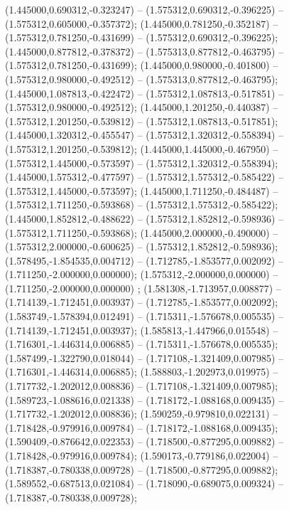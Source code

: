  (1.445000,0.690312,-0.323247) -- (1.575312,0.690312,-0.396225) -- (1.575312,0.605000,-0.357372);
 (1.445000,0.781250,-0.352187) -- (1.575312,0.781250,-0.431699) -- (1.575312,0.690312,-0.396225);
 (1.445000,0.877812,-0.378372) -- (1.575313,0.877812,-0.463795) -- (1.575312,0.781250,-0.431699);
 (1.445000,0.980000,-0.401800) -- (1.575312,0.980000,-0.492512) -- (1.575313,0.877812,-0.463795);
 (1.445000,1.087813,-0.422472) -- (1.575312,1.087813,-0.517851) -- (1.575312,0.980000,-0.492512);
 (1.445000,1.201250,-0.440387) -- (1.575312,1.201250,-0.539812) -- (1.575312,1.087813,-0.517851);
 (1.445000,1.320312,-0.455547) -- (1.575312,1.320312,-0.558394) -- (1.575312,1.201250,-0.539812);
 (1.445000,1.445000,-0.467950) -- (1.575312,1.445000,-0.573597) -- (1.575312,1.320312,-0.558394);
 (1.445000,1.575312,-0.477597) -- (1.575312,1.575312,-0.585422) -- (1.575312,1.445000,-0.573597);
 (1.445000,1.711250,-0.484487) -- (1.575312,1.711250,-0.593868) -- (1.575312,1.575312,-0.585422);
 (1.445000,1.852812,-0.488622) -- (1.575312,1.852812,-0.598936) -- (1.575312,1.711250,-0.593868);
 (1.445000,2.000000,-0.490000) -- (1.575312,2.000000,-0.600625) -- (1.575312,1.852812,-0.598936);
 (1.578495,-1.854535,0.004712) -- (1.712785,-1.853577,0.002092) -- (1.711250,-2.000000,0.000000);
 (1.575312,-2.000000,0.000000) -- (1.711250,-2.000000,0.000000) ;
 (1.581308,-1.713957,0.008877) -- (1.714139,-1.712451,0.003937) -- (1.712785,-1.853577,0.002092);
 (1.583749,-1.578394,0.012491) -- (1.715311,-1.576678,0.005535) -- (1.714139,-1.712451,0.003937);
 (1.585813,-1.447966,0.015548) -- (1.716301,-1.446314,0.006885) -- (1.715311,-1.576678,0.005535);
 (1.587499,-1.322790,0.018044) -- (1.717108,-1.321409,0.007985) -- (1.716301,-1.446314,0.006885);
 (1.588803,-1.202973,0.019975) -- (1.717732,-1.202012,0.008836) -- (1.717108,-1.321409,0.007985);
 (1.589723,-1.088616,0.021338) -- (1.718172,-1.088168,0.009435) -- (1.717732,-1.202012,0.008836);
 (1.590259,-0.979810,0.022131) -- (1.718428,-0.979916,0.009784) -- (1.718172,-1.088168,0.009435);
 (1.590409,-0.876642,0.022353) -- (1.718500,-0.877295,0.009882) -- (1.718428,-0.979916,0.009784);
 (1.590173,-0.779186,0.022004) -- (1.718387,-0.780338,0.009728) -- (1.718500,-0.877295,0.009882);
 (1.589552,-0.687513,0.021084) -- (1.718090,-0.689075,0.009324) -- (1.718387,-0.780338,0.009728);
